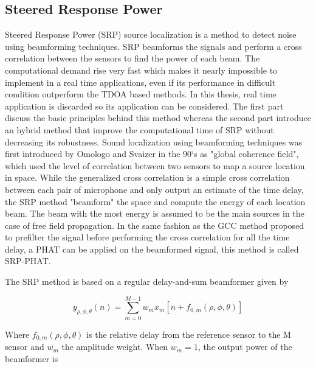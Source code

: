 \subsection{Steered Response Power}

Steered Response Power (SRP) source localization is a method to detect noise using beamforming techniques. SRP beamforms the signals and perform a cross correlation between the sensors to find the power of each beam. The computational demand rise very fast which makes it nearly impossible to implement in a real time applications, even if its performance in difficult condition outperform the TDOA based methods\cite{dmochowski2007generalized}. In this thesis, real time application is discarded so its application can be considered. The first part discuss the basic principles behind this method whereas the second part introduce an hybrid method that improve the computational time of SRP without decreasing its robustness. Sound localization using beamforming techniques was first introduced by Omologo and Svaizer in the 90`s \cite{omologo1997use} as "global coherence field", which used the level of correlation between two sensors to map a source location in space. While the generalized cross correlation is a simple cross correlation between each pair of microphone and only output an estimate of the time delay, the SRP method "beamform" the space and compute the energy of each location beam. The beam with the most energy is assumed to be the main sources in the case of free field propagation. In the same fashion as the GCC method proposed to prefilter the signal before performing the cross correlation for all the time delay, a PHAT can be applied on the beamformed signal, this method is called SRP-PHAT.


The SRP method is based on a regular delay-and-sum beamformer given by

\begin{equation}
    y_{\rho,\phi,\theta}(n)=\sum\limits_{m=0}^{M-1}{w_m x_m[n + f_{0,m}(\rho,\phi,\theta)]} 
\end{equation}

Where $f_{0,m}(\rho,\phi,\theta)$ is the relative delay from the reference sensor to the M sensor and $w_m$ the amplitude weight. When $w_m=1$, the output power of the beamformer is

